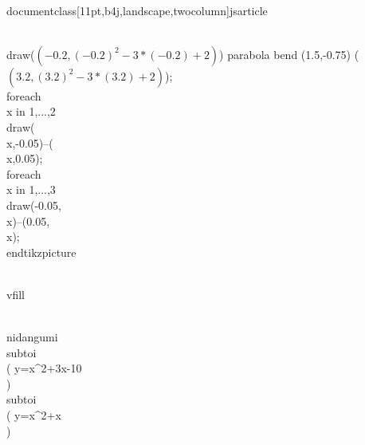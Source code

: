 \\documentclass[11pt,b4j,landscape,twocolumn]{jsarticle}
\begin{document}
\\draw($ (-0.2,{(-0.2)^2-3*(-0.2)+2}) $) parabola bend (1.5,-0.75) ($ (3.2,{(3.2)^2-3*(3.2)+2}) $);
\\foreach \\x in {1,...,2}{\\draw(\\x,-0.05)--(\\x,0.05);}
\\foreach \\x in {1,...,3}{\\draw(-0.05,\\x)--(0.05,\\x);}
\\end{tikzpicture}

\\vfill

\\nidangumi{\\subtoi \\( y=x^2+3x-10 \\) }
			{\\subtoi  \\(  y=x^2+x  \\) }
\end{document}
